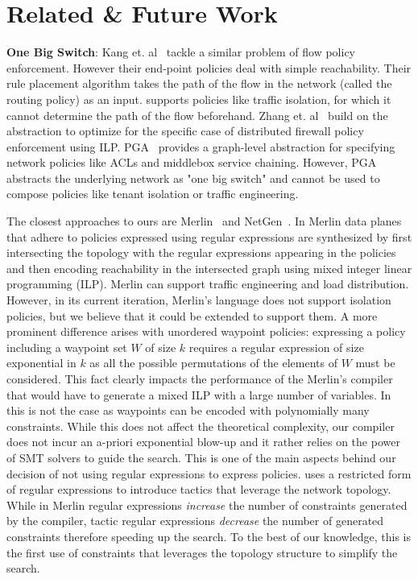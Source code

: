 \section{Related \& Future Work} \label{sec:relatedwork}
\textbf{One Big Switch}: Kang et. al~\cite{oneswitch} tackle a 
similar problem of flow policy
enforcement. However their end-point policies deal with simple
reachability. Their rule placement algorithm takes the path of the
flow in the network  (called the routing policy) as an input. %
\Name supports policies like traffic isolation, 
for which it cannot determine the path of the flow
beforehand. %
Zhang et. al~\cite{distfirewall} build on the~\cite{oneswitch} 
abstraction to optimize for the specific case of
distributed firewall policy enforcement using ILP.  PGA~\cite{pga} provides
a graph-level abstraction for specifying network policies like ACLs and
middlebox service chaining. However, PGA abstracts the underlying
network as "one big switch" and cannot be used to compose policies like
tenant isolation or traffic engineering.

The closest approaches to ours are Merlin~\cite{merlin} and
NetGen~\cite{netgen}.  In Merlin data planes that adhere to policies
expressed using regular expressions are synthesized by first
intersecting the topology with the regular expressions appearing in
the policies and then encoding reachability in the intersected graph
using mixed integer linear programming (ILP).
Merlin can support traffic engineering and load distribution. 
However, in its current iteration, 
Merlin's language does not support isolation policies, but we believe
that it could be extended to support them.  
A more prominent
difference arises with unordered waypoint policies: expressing a
policy including a waypoint set $W$ of size $k$ requires a regular
expression of size exponential in $k$ as all the possible permutations
of the elements of $W$ must be considered. This fact clearly impacts the performance of
the Merlin's compiler that would have to generate a mixed ILP with a
large number of variables.  In \Name this is not the case as waypoints
can be encoded with polynomially many constraints.  While this does
not affect the theoretical complexity, our compiler does not incur
an a-priori exponential blow-up and it rather relies on the power
of SMT solvers to guide the search.  This is one of the main aspects
behind our decision of not using regular expressions to express
policies.  \Name uses a restricted form of regular expressions to
introduce tactics that leverage the network topology.  While in Merlin
regular expressions \emph{increase} the number of constraints
generated by the compiler, tactic regular expressions \emph{decrease}
the number of generated constraints therefore speeding up the search.
To the best of our knowledge, this is the first use of constraints
that leverages the topology structure to simplify the search.

